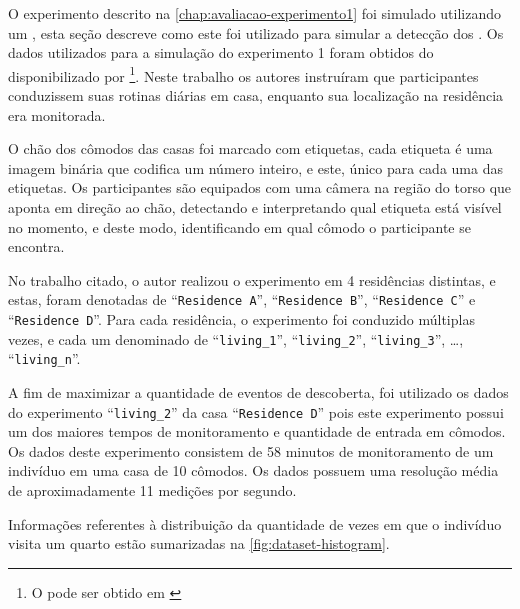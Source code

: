 O experimento descrito na \autoref{chap:avaliacao-experimento1} foi simulado utilizando um \dataset, esta seção descreve como este \dataset foi utilizado para simular a detecção dos \beacons. Os dados utilizados para a simulação do experimento 1 foram obtidos do \dataset disponibilizado por \footnote{O \dataset pode ser obtido em \cite{byrne:kozlowski:dataset:2019}}. Neste trabalho os autores instruíram que participantes conduzissem suas rotinas diárias em casa, enquanto sua localização na residência era monitorada.

O chão dos cômodos das casas foi marcado com etiquetas, cada etiqueta é uma imagem binária que codifica um número inteiro, e este, único para cada uma das etiquetas. Os participantes são equipados com uma câmera na região do torso que aponta em direção ao chão, detectando e interpretando qual etiqueta está visível no momento, e deste modo, identificando em qual cômodo o participante se encontra.

No trabalho citado, o autor realizou o experimento em 4 residências distintas, e estas, foram denotadas de ``\texttt{Residence A}'', ``\texttt{Residence B}'', ``\texttt{Residence C}'' e ``\texttt{Residence D}''. Para cada residência, o experimento foi conduzido múltiplas vezes, e cada um denominado de ``\texttt{living\_1}'', ``\texttt{living\_2}'', ``\texttt{living\_3}'', \dots{}, ``\texttt{living\_n}''.


A fim de maximizar a quantidade de eventos de descoberta, foi utilizado os dados do experimento ``\texttt{living\_2}'' da casa ``\texttt{Residence D}'' pois este experimento possui um dos maiores tempos de monitoramento e quantidade de entrada em cômodos. Os dados deste experimento consistem de 58 minutos de monitoramento de um indivíduo em uma casa de 10 cômodos. Os dados possuem uma resolução média de aproximadamente 11 medições por segundo.

Informações referentes à distribuição da quantidade de vezes em que o indivíduo visita um quarto estão sumarizadas na \autoref{fig:dataset-histogram}.

